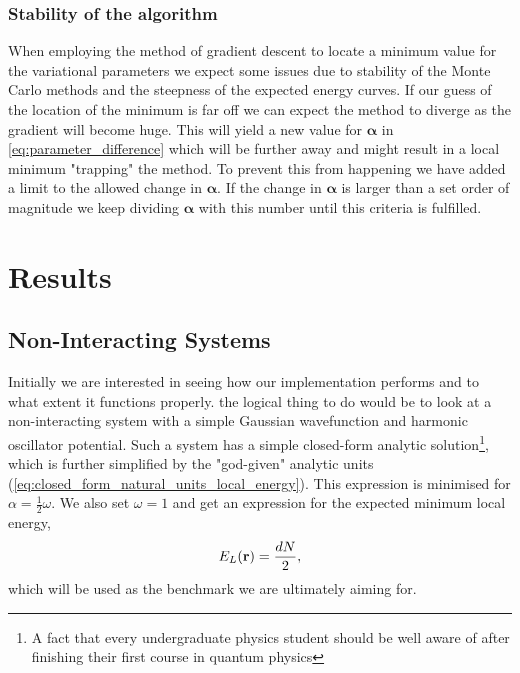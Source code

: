 \documentclass[
    a4paper, aps, twocolumn, floatfix, superscriptaddress,
    nofootinbib]{revtex4-1}
\newcommand{\vfg}{\boldsymbol}
\newcommand{\1}{\mathds{1}}
\begin{document}
            \subsubsection{Stability of the algorithm}
                When employing the method of gradient descent to locate a
                minimum value for the variational parameters we expect some
                issues due to stability of the Monte Carlo methods and the
                steepness of the expected energy curves. If our guess of the
                location of the minimum is far off we can expect the method to
                diverge as the gradient will become huge. This will yield a
                new value for $\vfg{\alpha}$ in
                \autoref{eq:parameter_difference} which will be further away and
                might result in a local minimum "trapping" the method. To
                prevent this from happening we have added a limit to the allowed
                change in $\vfg{\alpha}$. If the change in $\vfg{\alpha}$ is
                larger than a set order of magnitude we keep dividing
                $\vfg{\alpha}$ with this number until this criteria is
                fulfilled.

\section{Results}

    \subsection{Non-Interacting Systems}
        Initially we are interested in seeing how our implementation performs
        and to what extent it functions properly.  the logical thing to do would
        be to look at a non-interacting system with a simple Gaussian
        wavefunction and harmonic oscillator potential. Such a system has a
        simple closed-form analytic solution\footnote{A fact that every
        undergraduate physics student should be well aware of after finishing
        their first course in quantum physics}, which is further simplified by
        the "god-given" analytic units
        (\autoref{eq:closed_form_natural_units_local_energy}). This expression
        is minimised for $\alpha = \frac{1}{2}\omega$. We also set $\omega = 1$
        and get an expression for the expected minimum local energy,
        \begin{equation}
            E_L(\vb{r}) = \frac{dN}{2},
        \end{equation}
        which will be used as the benchmark we are ultimately aiming for.
\end{document}
